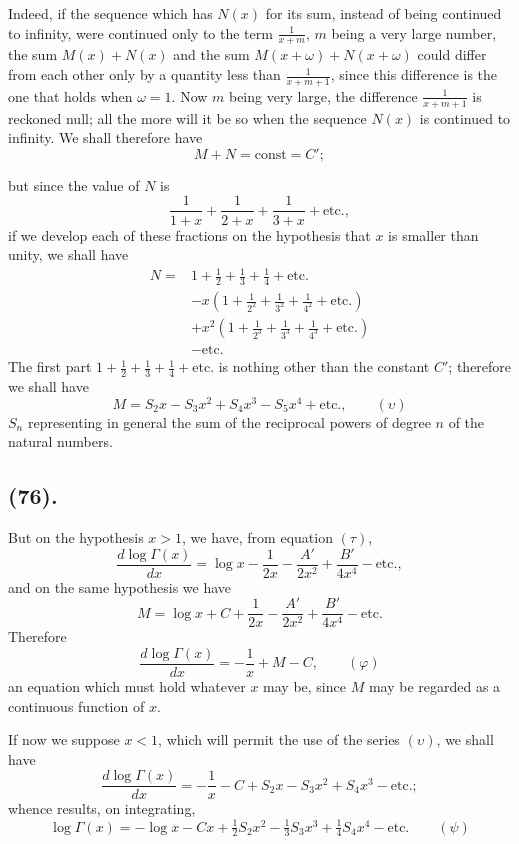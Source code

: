 \documentclass{article}
\begin{document}
Indeed, if the sequence which has $N(x)$ for its sum, instead of being continued to infinity, were continued only to the term $\frac{1}{x+m}$, $m$ being a very large number, the sum $M(x)+N(x)$ and the sum $M(x+\omega)+N(x+\omega)$ could differ from each other only by a quantity less than $\frac{1}{x+m+1}$, since this difference is the one that holds when $\omega=1$. Now $m$ being very large, the difference $\frac{1}{x+m+1}$ is reckoned null; all the more will it be so when the sequence $N(x)$ is continued to infinity. We shall therefore have
\[ M+N=\text{const}=C'; \]

but since the value of $N$ is
\[ \frac{1}{1+x}+\frac{1}{2+x}+\frac{1}{3+x}+\text{etc.}, \]
if we develop each of these fractions on the hypothesis that $x$ is smaller than unity, we shall have
\[ \begin{aligned} N={}&1+\tfrac{1}{2}+\tfrac{1}{3}+\tfrac{1}{4}+\text{etc.}\\ &-x\left(1+\frac{1}{2^{2}}+\frac{1}{3^{2}}+\frac{1}{4^{2}}+\text{etc.}\right)\\ &+x^{2}\left(1+\frac{1}{2^{3}}+\frac{1}{3^{3}}+\frac{1}{4^{3}}+\text{etc.}\right)\\ &-\text{etc.} \end{aligned} \]
The first part $1+\frac{1}{2}+\frac{1}{3}+\frac{1}{4}+\text{etc.}$ is nothing other than the constant $C'$; therefore we shall have
\[ M=S_{2}x-S_{3}x^{2}+S_{4}x^{3}-S_{5}x^{4}+\text{etc.},\qquad(\upsilon) \]
$S_{n}$ representing in general the sum of the reciprocal powers of degree $n$ of the natural numbers.

\subsection*{(76).}

But on the hypothesis $x>1$, we have, from equation $(\tau)$,
\[ \frac{d\log\Gamma(x)}{dx}=\log x-\frac{1}{2x}-\frac{A'}{2x^{2}}+\frac{B'}{4x^{4}}-\text{etc.}, \]
and on the same hypothesis we have
\[ M=\log x+C+\frac{1}{2x}-\frac{A'}{2x^{2}}+\frac{B'}{4x^{4}}-\text{etc.} \]
Therefore
\[ \frac{d\log\Gamma(x)}{dx}=-\frac{1}{x}+M-C,\qquad(\varphi) \]
an equation which must hold whatever $x$ may be, since $M$ may be regarded as a continuous function of $x$.

If now we suppose $x<1$, which will permit the use of the series $(\upsilon)$, we shall have
\[ \frac{d\log\Gamma(x)}{dx}=-\frac{1}{x}-C+S_{2}x-S_{3}x^{2}+S_{4}x^{3}-\text{etc.}; \]
whence results, on integrating,
\[ \log\Gamma(x)=-\log x-Cx+\tfrac{1}{2}S_{2}x^{2}-\tfrac{1}{3}S_{3}x^{3}+\tfrac{1}{4}S_{4}x^{4}-\text{etc.}\qquad(\psi) \]
\end{document}
